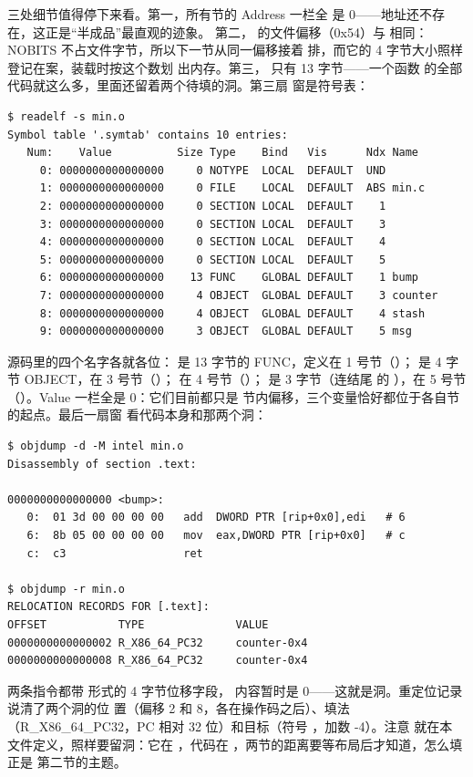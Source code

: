 三处细节值得停下来看。第一，所有节的 Address 一栏全
是 0——地址还不存在，这正是“半成品”最直观的迹象。
第二， 的文件偏移（0x54）与 
相同：NOBITS 不占文件字节，所以下一节从同一偏移接着
排，而它的 4 字节大小照样登记在案，装载时按这个数划
出内存。第三， 只有 13 字节——一个函数
的全部代码就这么多，里面还留着两个待填的洞。第三扇
窗是符号表：

\begin{lstlisting}
$ readelf -s min.o
Symbol table '.symtab' contains 10 entries:
   Num:    Value          Size Type    Bind   Vis      Ndx Name
     0: 0000000000000000     0 NOTYPE  LOCAL  DEFAULT  UND
     1: 0000000000000000     0 FILE    LOCAL  DEFAULT  ABS min.c
     2: 0000000000000000     0 SECTION LOCAL  DEFAULT    1
     3: 0000000000000000     0 SECTION LOCAL  DEFAULT    3
     4: 0000000000000000     0 SECTION LOCAL  DEFAULT    4
     5: 0000000000000000     0 SECTION LOCAL  DEFAULT    5
     6: 0000000000000000    13 FUNC    GLOBAL DEFAULT    1 bump
     7: 0000000000000000     4 OBJECT  GLOBAL DEFAULT    3 counter
     8: 0000000000000000     4 OBJECT  GLOBAL DEFAULT    4 stash
     9: 0000000000000000     3 OBJECT  GLOBAL DEFAULT    5 msg
\end{lstlisting}

源码里的四个名字各就各位： 是 13 字节的
FUNC，定义在 1 号节（）； 是
4 字节 OBJECT，在 3 号节（）；
在 4 号节（）； 是 3 字节（连结尾
的 ），在 5 号节
（）。Value 一栏全是 0：它们目前都只是
节内偏移，三个变量恰好都位于各自节的起点。最后一扇窗
看代码本身和那两个洞：

\begin{lstlisting}
$ objdump -d -M intel min.o
Disassembly of section .text:

0000000000000000 <bump>:
   0:  01 3d 00 00 00 00   add  DWORD PTR [rip+0x0],edi   # 6
   6:  8b 05 00 00 00 00   mov  eax,DWORD PTR [rip+0x0]   # c
   c:  c3                  ret

$ objdump -r min.o
RELOCATION RECORDS FOR [.text]:
OFFSET           TYPE              VALUE
0000000000000002 R_X86_64_PC32     counter-0x4
0000000000000008 R_X86_64_PC32     counter-0x4
\end{lstlisting}

两条指令都带 \code{[rip+0x0]} 形式的 4 字节位移字段，
内容暂时是 0——这就是洞。重定位记录说清了两个洞的位
置（偏移 2 和 8，各在操作码之后）、填法
（R\_X86\_64\_PC32，PC 相对 32 位）和目标（符号
，加数 -4）。注意  就在本
文件定义，照样要留洞：它在 ，代码在
，两节的距离要等布局后才知道，怎么填正是
第二节的主题。


